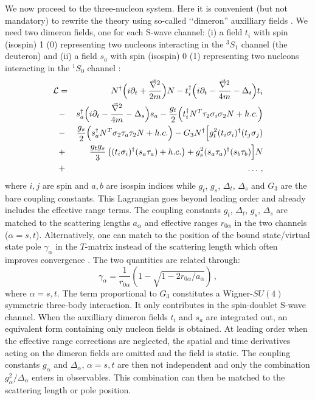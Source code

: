 \documentclass[aps,rmp,nofootinbib,twocolumn,floatfix]{revtex4}
\newcommand{\beq}{\begin{equation}}
\newcommand{\eeq}{\end{equation}}
\newcommand{\beqa}{\begin{eqnarray}}
\newcommand{\eeqa}{\end{eqnarray}}
\begin{document}
We now proceed to the three-nucleon system.
Here it is convenient (but not mandatory) to rewrite the 
theory using so-called \lq\lq dimeron'' 
auxilliary fields \cite{Kaplan:1996nv}.
We need two dimeron fields, one for each S-wave channel:
(i) a field $t_i$ with
spin (isospin) 1 (0) representing two nucleons interacting in the $^3 S_1$
channel (the deuteron) and
(ii) a field $s_a$ with
spin (isospin) 0 (1) representing two nucleons interacting in the $^1 S_0$
channel \cite{Bedaque:1999ve}:
\beqa
{\cal L}&=&N^\dagger \Big(i\partial_t +\frac{\vec{\nabla}^2}
{2m}\Big)N - t^\dagger_i \Big(i\partial_t -\frac{\vec{\nabla}^2}
{4m} -\Delta_t \Big) t_i \nonumber\\
&-& s^\dagger_a \Big(i\partial_t -\frac{\vec{\nabla}^2}
{4m} -\Delta_s \Big) s_a
- \frac{g_t}{2}\Big( t^\dagger_i N^T \tau_2 \sigma_i
\sigma_2 N +h.c.\Big) 
\nonumber \\
&-&\frac{g_s}{2}\Big(s^\dagger_a N^T \sigma_2 \tau_a \tau_2 N +h.c.\Big) 
-G_3 N^\dagger \Big[ g_t^2
(t_i \sigma_i)^\dagger (t_j\sigma_j) \nonumber \\
&+& \frac{g_t g_s}{3} \left( (t_i\sigma_i)^\dagger
(s_a \tau_a) + h.c. \right) 
+ g_s^2 (s_a \tau_a)^\dagger (s_b \tau_b) \Big] N\nonumber \\
&+&\ldots\,,
\label{lagd}
\eeqa
where $i,j$ are spin and $a,b$ are isospin indices
while  $g_t$, $g_s$, $\Delta_t$, $\Delta_s$
and $G_3$ are the bare coupling constants.
This Lagrangian goes beyond leading order and
already includes the effective range terms. The coupling
constants $g_t$, $\Delta_t$, $g_s$, $\Delta_s$ are matched to the
scattering lengths $a_\alpha$ and effective ranges $r_{0\alpha}$
in the two channels ($\alpha=s,t$). Alternatively, one can 
match to the position of the 
bound state/virtual state pole $\gamma_\alpha$ 
in the $T$-matrix instead of the 
scattering length which often improves convergence \cite{Phillips:1999hh}.
The two quantities are related through:
\beq
\gamma_\alpha=\frac{1}{r_{0\alpha}}\left(1-\sqrt{1-2r_{0\alpha}/a_\alpha}
\right)\,,
\eeq
where $\alpha=s,t$. 
The term proportional to $G_3$ constitutes a Wigner-$SU(4)$
symmetric three-body interaction. It only contributes in the 
spin-doublet S-wave channel.
When the auxilliary dimeron fields $t_i$
and $s_a$ are integrated out, an equivalent form containing only nucleon 
fields is obtained.
At leading order when the effective range corrections are neglected, 
the spatial and time derivatives acting on the dimeron
fields are omitted and the field is static. 
The coupling constants $g_\alpha$ and $\Delta_\alpha$,
$\alpha=s,t$ are then not
independent and only the combination $g_\alpha^2/\Delta_\alpha$ enters in 
observables. This combination can then be matched to the scattering length
or pole position.
\end{document}
